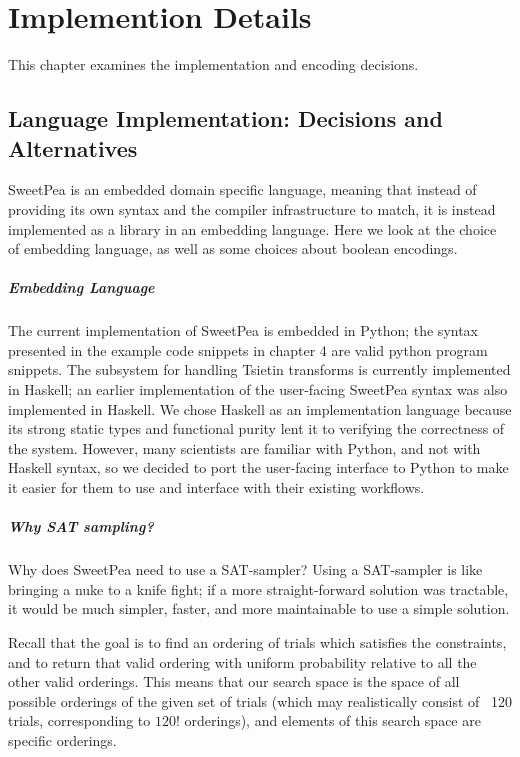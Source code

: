 
\chapter{Implemention Details}

This chapter examines the implementation and encoding decisions.

\section{Language Implementation: Decisions and Alternatives}

SweetPea is an embedded domain specific language, meaning that instead of providing its own syntax and the compiler infrastructure to match, it is instead implemented as a library in an embedding language. Here we look at the choice of embedding language, as well as some choices about boolean encodings.

\paragraph*{Embedding Language}

The current implementation of SweetPea is embedded in Python; the syntax presented in the example code snippets in chapter 4 are valid python program snippets. The subsystem for handling Tsietin transforms is currently implemented in Haskell; an earlier implementation of the user-facing SweetPea syntax was also implemented in Haskell. We chose Haskell as an implementation language because its strong static types and functional purity lent it to verifying the correctness of the system. However, many scientists are familiar with Python, and not with Haskell syntax, so we decided to port the user-facing interface to Python to make it easier for them to use and interface with their existing workflows.

\paragraph*{Why SAT sampling?}

Why does SweetPea need to use a SAT-sampler? Using a SAT-sampler is like bringing a nuke to a knife fight; if a more straight-forward solution was tractable, it would be much simpler, faster, and more maintainable to use a simple solution.

Recall that the goal is to find an ordering of trials which satisfies the constraints, and to return that valid ordering with uniform probability relative to all the other valid orderings. This means that our search space is the space of all possible orderings of the given set of trials (which may realistically consist of ~120 trials, corresponding to $120!$ orderings), and elements of this search space are specific orderings.

